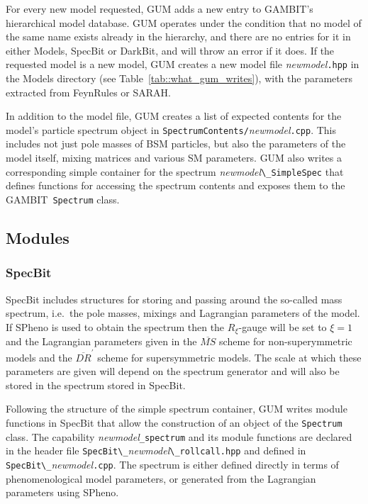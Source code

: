 \documentclass[pdftex,twocolumn,epjc3_preprint,runningheads]{svjour3}
\renewcommand{\_}{\discretionary{\underscore}{}{\underscore}}
\newcommand\cpp[1]{{\lstinline!#1!}}  %
\newcommand\term[1]{{\lstset{style=terminal}\lstinline!#1!\lstset{style=cpp}}}
\newcommand{\metavarf}[1]{\textit{\color{darkgreen}\footnotesize\textrm{#1}}}
\newcommand{\metavar}{\metavarf}
\newcommand{\gambit}{\textsf{GAMBIT}\xspace}
\newcommand{\darkbit}{\textsf{DarkBit}\xspace}
\newcommand{\specbit}{\textsf{SpecBit}\xspace}
\newcommand{\GB}{\gambit}
\newcommand{\gum}{\textsf{GUM}\xspace}
\newcommand{\fr}{\textsf{FeynRules}\xspace}
\newcommand{\sarah}{\textsf{SARAH}\xspace}
\newcommand{\spheno}{\textsf{SPheno}\xspace}
\newcommand{\nm}{\metavar{new\_model}}
\begin{document}
For every new model requested, \gum adds a new entry to \GB's hierarchical model database. \gum operates under the condition that no model of the same name exists already in the hierarchy, and there are no entries for it in either \textsf{Models}, \specbit or \darkbit, and will throw an error if it does. If the requested model is a new model, \gum creates a new model file \nm\term{.hpp} in the Models directory (see Table~\ref{tab::what_gum_writes}), with the parameters extracted from \fr or \sarah.

In addition to the model file, \gum creates a list of expected contents for the model's particle spectrum object in \term{SpectrumContents/}\nm\term{.cpp}.  This includes not just pole masses of BSM particles, but also the parameters of the model itself, mixing matrices and various SM parameters. \gum also writes a corresponding simple container for the spectrum \nm\term{\_SimpleSpec} that defines functions for accessing the spectrum contents and exposes them to the \gambit~\cpp{Spectrum} class.


\subsection{Modules}\label{sec:modules}

\subsubsection{\specbit}

\specbit includes structures for storing and passing around the so-called mass spectrum, i.e.\ the pole masses, mixings and Lagrangian parameters of the model. If \spheno is used to obtain the spectrum then the $R_\xi$-gauge will be set to $\xi=1$ and the Lagrangian parameters given in the $\overline{MS}$ scheme for non-superymmetric models and the $\overline{DR}^\prime$ scheme for supersymmetric models.  The scale at which these parameters are given will depend on the spectrum generator and will also be stored in the spectrum stored in \specbit.

Following the structure of the simple spectrum container, \gum writes module functions in \specbit that allow the construction of an object of the \cpp{Spectrum} class. The capability \nm\cpp{_spectrum} and its module functions are declared in the header file \term{SpecBit\_}\nm\term{\_rollcall.hpp} and defined in \term{SpecBit\_}\nm\term{.cpp}. The spectrum is either defined directly in terms of phenomenological model parameters, or generated from the Lagrangian parameters using \spheno.
\end{document}
